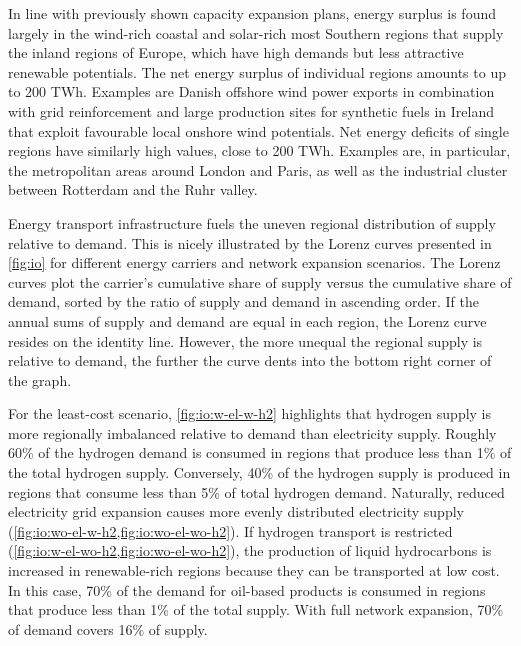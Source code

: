 In line with previously shown capacity expansion plans, energy surplus is found
largely in the wind-rich coastal and solar-rich most Southern regions that
supply the inland regions of Europe, which have high demands but less attractive
renewable potentials. The net energy surplus of individual regions amounts to up
to 200 TWh. Examples are Danish offshore wind power exports in combination with
grid reinforcement and large production sites for synthetic fuels in Ireland
that exploit favourable local onshore wind potentials. Net energy deficits of
single regions have similarly high values, close to 200 TWh. Examples are, in
particular, the metropolitan areas around London and Paris, as well as the
industrial cluster between Rotterdam and the Ruhr valley.

Energy transport infrastructure fuels the uneven regional distribution of supply
relative to demand. This is nicely illustrated by the Lorenz curves presented in
\cref{fig:io} for different energy carriers and network expansion scenarios. The
Lorenz curves plot the carrier's cumulative share of supply versus the
cumulative share of demand, sorted by the ratio of supply and demand in
ascending order. If the annual sums of supply and demand are equal in each
region, the Lorenz curve resides on the identity line. However, the more unequal
the regional supply is relative to demand, the further the curve dents into the
bottom right corner of the graph.

For the least-cost scenario, \cref{fig:io:w-el-w-h2} highlights that hydrogen
supply is more regionally imbalanced relative to demand than electricity supply.
Roughly 60\% of the hydrogen demand is consumed in regions that produce less
than 1\% of the total hydrogen supply. Conversely, 40\% of the hydrogen supply
is produced in regions that consume less than 5\% of total hydrogen demand.
Naturally, reduced electricity grid expansion causes more evenly distributed
electricity supply (\cref{fig:io:wo-el-w-h2,fig:io:wo-el-wo-h2}). If hydrogen
transport is restricted (\cref{fig:io:w-el-wo-h2,fig:io:wo-el-wo-h2}), the
production of liquid hydrocarbons is increased in renewable-rich regions because
they can be transported at low cost. In this case, 70\% of the demand for
oil-based products is consumed in regions that produce less than 1\% of the
total supply. With full network expansion, 70\% of demand covers 16\% of supply.


